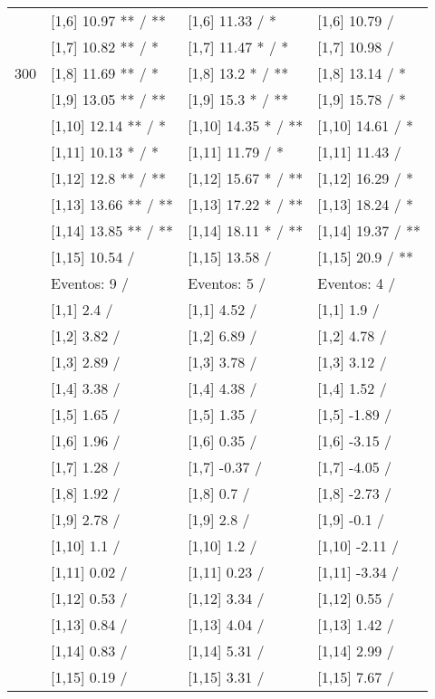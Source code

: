 \begin{table}
\begin{tabular}[t]{llll}
 & {}[1,6] 10.97 ** / ** & {}[1,6] 11.33  / * & {}[1,6] 10.79  /\\
 & {}[1,7] 10.82 ** / * & {}[1,7] 11.47 * / * & {}[1,7] 10.98  /\\
300 & {}[1,8] 11.69 ** / * & {}[1,8] 13.2 * / ** & {}[1,8] 13.14  / *\\
\addlinespace
 & {}[1,9] 13.05 ** / ** & {}[1,9] 15.3 * / ** & {}[1,9] 15.78  / *\\
 & {}[1,10] 12.14 ** / * & {}[1,10] 14.35 * / ** & {}[1,10] 14.61  / *\\
 & {}[1,11] 10.13 * / * & {}[1,11] 11.79  / * & {}[1,11] 11.43  /\\
 & {}[1,12] 12.8 ** / ** & {}[1,12] 15.67 * / ** & {}[1,12] 16.29  / *\\
 & {}[1,13] 13.66 ** / ** & {}[1,13] 17.22 * / ** & {}[1,13] 18.24  / *\\
\addlinespace
 & {}[1,14] 13.85 ** / ** & {}[1,14] 18.11 * / ** & {}[1,14] 19.37  / **\\
 & {}[1,15] 10.54  / & {}[1,15] 13.58  / & {}[1,15] 20.9  / **\\
 & Eventos:  9 / & Eventos:  5 / & Eventos:  4 /\\
 & {}[1,1] 2.4  / & {}[1,1] 4.52  / & {}[1,1] 1.9  /\\
 & {}[1,2] 3.82  / & {}[1,2] 6.89  / & {}[1,2] 4.78  /\\
\addlinespace
 & {}[1,3] 2.89  / & {}[1,3] 3.78  / & {}[1,3] 3.12  /\\
 & {}[1,4] 3.38  / & {}[1,4] 4.38  / & {}[1,4] 1.52  /\\
 & {}[1,5] 1.65  / & {}[1,5] 1.35  / & {}[1,5] -1.89  /\\
 & {}[1,6] 1.96  / & {}[1,6] 0.35  / & {}[1,6] -3.15  /\\
 & {}[1,7] 1.28  / & {}[1,7] -0.37  / & {}[1,7] -4.05  /\\
\addlinespace
500 & {}[1,8] 1.92  / & {}[1,8] 0.7  / & {}[1,8] -2.73  /\\
 & {}[1,9] 2.78  / & {}[1,9] 2.8  / & {}[1,9] -0.1  /\\
 & {}[1,10] 1.1  / & {}[1,10] 1.2  / & {}[1,10] -2.11  /\\
 & {}[1,11] 0.02  / & {}[1,11] 0.23  / & {}[1,11] -3.34  /\\
 & {}[1,12] 0.53  / & {}[1,12] 3.34  / & {}[1,12] 0.55  /\\
\addlinespace
 & {}[1,13] 0.84  / & {}[1,13] 4.04  / & {}[1,13] 1.42  /\\
 & {}[1,14] 0.83  / & {}[1,14] 5.31  / & {}[1,14] 2.99  /\\
 & {}[1,15] 0.19  / & {}[1,15] 3.31  / & {}[1,15] 7.67  /\\
\bottomrule
\end{tabular}
\end{table}
